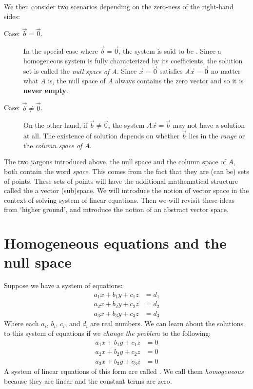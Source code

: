 \documentclass{ximera}
\begin{document}
We then consider two scenarios depending on the zero-ness of the right-hand
sides:
\begin{description}
  \item[Case: $\vec{b} = \vec{0}$.] In the special case where $\vec{b} =
      \vec{0}$,
    the system is said to be . Since a homogeneous system is
    fully characterized by its coefficients, the solution set is called the
    \textit{null space of $A$}. Since $\vec{x} = \vec{0}$ satisfies $A\vec{x} =
      \vec{0}$ no matter what $A$ is, the null space of $A$ always contains the
    zero
    vector and so it is \textbf{never empty}.
  \item[Case: $\vec{b} \neq \vec{0}$.] On the other hand, if $\vec{b} \neq
      \vec{0}$, the system $A\vec{x} = \vec{b}$ may not have a solution at all.
    The
    existence of solution depends on whether $\vec{b}$ lies in the
    \textit{range}
    or the \textit{column space of $A$}.
\end{description}

The two jargons introduced above, the null space and the column space of $A$,
both contain the word \textit{space}. This comes from the fact that they are
(can be)
sets of points. These sets of points will have the additional mathematical
structure called the a vector (sub)space. We will introduce the notion of
vector
space in the context of solving system of linear equations. Then we will
revisit
these ideas from `higher ground', and introduce the notion of an abstract
vector
space.

\section{Homogeneous equations and the null space}
Suppose we have a system of equations:
\begin{align*}
  a_1 x + b_1 y + c_1 z & = d_1 \\
  a_2 x + b_2 y + c_2 z & = d_2 \\
  a_3 x + b_3 y + c_3 z & = d_3
\end{align*}
Where each $a_i$, $b_i$, $c_i$, and $d_i$ are real numbers. We can
learn about the solutions to this system of equations if we
\textit{change the problem} to the following:
\begin{align*}
  a_1 x + b_1 y + c_1 z & = 0 \\
  a_2 x + b_2 y + c_2 z & = 0 \\
  a_3 x + b_3 y + c_3 z & = 0
\end{align*}
A system of linear equations of this form are called . We call
them \textit{homogeneous} because they are linear and the constant terms are
zero.
\end{document}
